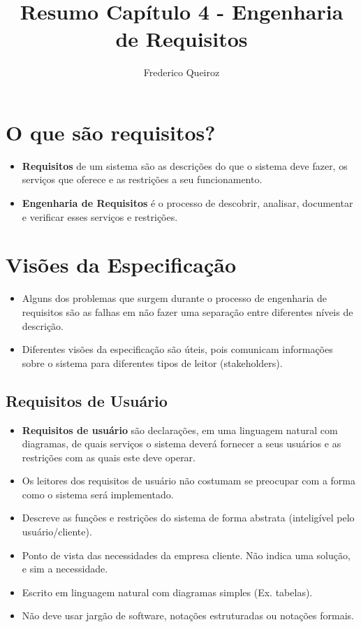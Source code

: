 \documentclass[a4paper, 11pt]{article}
\author{Frederico Queiroz}
\title{Resumo Capítulo 4 - Engenharia de Requisitos}
\begin{document}
\maketitle

\section{O que são requisitos?}
\begin{itemize}
    \item \textbf{Requisitos} de um sistema são as descrições do que o sistema deve fazer, os serviços que oferece e as restrições a seu funcionamento.
    \item \textbf{Engenharia de Requisitos} é o processo de descobrir, analisar, documentar e verificar esses serviços e restrições. 
\end{itemize}

\section{Visões da Especificação}
\begin{itemize}
    \item Alguns dos problemas que surgem durante o processo de engenharia de requisitos são as falhas em não fazer uma separação entre diferentes níveis de descrição.
    \item Diferentes visões da especificação são úteis, pois comunicam informações sobre o sistema para diferentes tipos de leitor (stakeholders).
\end{itemize}

\subsection{Requisitos de Usuário}
\begin{itemize}
    \item \textbf{Requisitos de usuário} são declarações, em uma linguagem natural com diagramas, de quais serviços o sistema deverá fornecer a seus usuários
    e as restrições com as quais este deve operar.
    \item Os leitores dos requisitos de usuário não costumam se preocupar com a forma como o sistema será implementado.
    \item Descreve as funções e restrições do sistema de forma abstrata (inteligível pelo usuário/cliente).
    \item Ponto de vista das necessidades da empresa cliente. Não indica uma solução, e sim a necessidade.
    \item Escrito em linguagem natural com diagramas simples (Ex. tabelas).
	\item Não deve usar jargão de software, notações estruturadas ou notações formais. 
\end{itemize}
\end{document}
